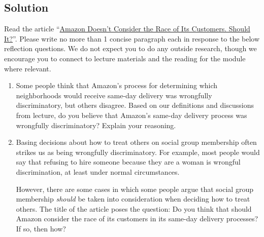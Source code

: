 \documentclass[submit]{harvardml}
\begin{document}
\subsection*{Solution}

\newpage

\begin{problem}

Read the article ``\href{https://www.bloomberg.com/graphics/2016-amazon-same-day/}{Amazon Doesn’t Consider the Race of Its Customers. Should It?}''. Please write no more than 1 concise paragraph each in response to the below reflection questions.  We do not expect you to do any outside research, though we encourage you to connect to lecture materials and the reading for the module where relevant.

\begin{enumerate}
    \item Some people think that Amazon’s process for determining which neighborhoods would receive same-day delivery was wrongfully discriminatory, but others disagree.  Based on our definitions and discussions from lecture, do you believe that Amazon's same-day delivery process was wrongfully discriminatory? Explain your reasoning.
    
    
    \item Basing decisions about how to treat others on social group membership often strikes us as being wrongfully discriminatory. For example, most people would say that refusing to hire someone because they are a woman is wrongful discrimination, at least under normal circumstances.
    
    However, there are some cases in which some people argue that social group membership \emph{should} be taken into consideration when deciding how to treat others.  The title of the article poses the question: Do you think that should Amazon consider the race of its customers in its same-day delivery processes? If so, then how? 
    
    

\end{enumerate}
\end{problem}
\end{document}
